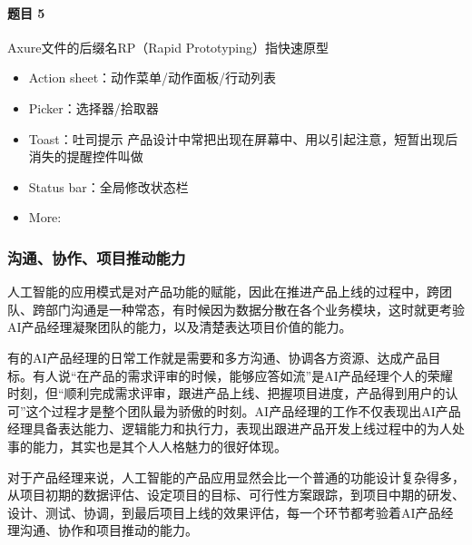 \documentclass[letterpaper,11pt,english]{sphinxmanual}
\begin{document}
\paragraph{题目 5\sphinxfootnotemark[189]}
\label{\detokenize{chapter_skill/prototype_design:id9}}%
\begin{footnotetext}[189]\sphinxAtStartFootnote
{}
%
\end{footnotetext}\ignorespaces 
Axure文件的后缀名RP（Rapid Prototyping）指快速原型
\begin{itemize}
\item {} 
Action sheet：动作菜单/动作面板/行动列表

\item {} 
Picker：选择器/拾取器

\item {} 
Toast：吐司提示
产品设计中常把出现在屏幕中、用以引起注意，短暂出现后消失的提醒控件叫做

\item {} 
Status bar：全局修改状态栏

\item {} 
More: %
\begin{footnote}[190]\sphinxAtStartFootnote
{}
%
\end{footnote}

\end{itemize}


\subsubsection{沟通、协作、项目推动能力}
\label{\detokenize{chapter_skill/collaborate:id1}}\label{\detokenize{chapter_skill/collaborate::doc}}
人工智能的应用模式是对产品功能的赋能，因此在推进产品上线的过程中，跨团队、跨部门沟通是一种常态，有时候因为数据分散在各个业务模块，这时就更考验AI产品经理凝聚团队的能力，以及清楚表达项目价值的能力。

有的AI产品经理的日常工作就是需要和多方沟通、协调各方资源、达成产品目标。有人说“在产品的需求评审的时候，能够应答如流”是AI产品经理个人的荣耀时刻，但“顺利完成需求评审，跟进产品上线、把握项目进度，产品得到用户的认可”这个过程才是整个团队最为骄傲的时刻。AI产品经理的工作不仅表现出AI产品经理具备表达能力、逻辑能力和执行力，表现出跟进产品开发上线过程中的为人处事的能力，其实也是其个人人格魅力的很好体现。

对于产品经理来说，人工智能的产品应用显然会比一个普通的功能设计复杂得多，从项目初期的数据评估、设定项目的目标、可行性方案跟踪，到项目中期的研发、设计、测试、协调，到最后项目上线的效果评估，每一个环节都考验着AI产品经理沟通、协作和项目推动的能力。
\end{document}
